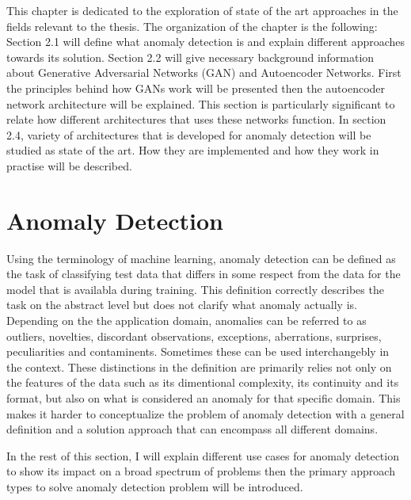 \begingroup

This chapter is dedicated to the exploration of state of the art approaches in the fields relevant
to the thesis. The organization of the chapter is the following: Section 2.1 will define what
anomaly detection is and explain different approaches towards its solution.  Section 2.2 will give
necessary background information about Generative Adversarial Networks (GAN) and Autoencoder
Networks. First the principles behind how GANs work will be presented then the autoencoder network
architecture will be explained. This section is particularly significant to relate how different
architectures that uses these networks function. In section 2.4, variety of architectures that is
developed for anomaly detection will be studied as state of the art. How they are implemented and
how they work in practise will be described.

\section{Anomaly Detection}

Using the terminology of machine learning, anomaly detection can be defined as the task of
classifying test data that differs in some respect from the data for the model that is availabla
during training. \cite{Pimentel:2014:RRN:2588908.2589196} This definition correctly describes the
task on the abstract level but does not clarify what anomaly actually is. Depending on the the
application domain, anomalies can be referred to as outliers, novelties, discordant observations,
exceptions, aberrations, surprises, peculiarities and
contaminents.\cite{Chandola:2009:ADS:1541880.1541882} Sometimes these can be used interchangebly in
the context. These distinctions in the definition are primarily relies not only on the features of
the data such as its dimentional complexity, its continuity and its format, but also on what is
considered an anomaly for that specific domain. This makes it harder to conceptualize the problem of
anomaly detection with a general definition and a solution approach that can encompass all different
domains.

In the rest of this section, I will explain different use cases for anomaly detection to show its
impact on a broad spectrum of problems then the primary approach types to solve anomaly detection
problem will be introduced.

